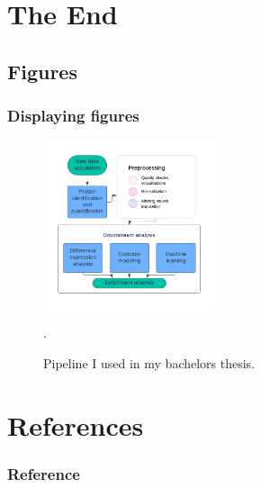 \documentclass[xcolor={usenames,dvipsnames},aspectratio=169, 12pt]{beamer}
\begin{document}
\section{The End}
\subsection{Figures}
\begin{frame}
\frametitle{Displaying figures}
  \begin{figure}[htbp]
    \centering
    \includegraphics[width = 0.45\textwidth]{assets/proposed_pipeline2.pdf}
    \caption{Pipeline I used in my bachelors thesis.}
    \DeclareGraphicsExtensions.
  \end{figure}
\end{frame}


\section{References}
%
\begin{frame}[allowframebreaks]
\frametitle{Reference}
\footnotesize


\end{frame}

\ThankYouFrame
\end{document}
